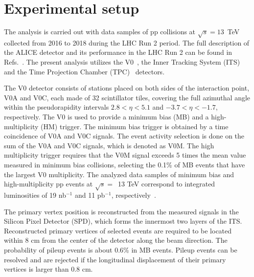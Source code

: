 

\section{Experimental setup}
\label{sec:experiment}

The analysis is carried out with data samples of pp collisions at $\sqrt{s} = 13$~TeV collected from 2016 to 2018 during the LHC Run 2 period. The full description of the ALICE detector and its performance in the LHC Run 2 can be found in Refs.~\cite{Aamodt:2008zz,Abelev:2014ffa}. The present analysis utilizes the V0~\cite{Abbas:2013taa}, the Inner Tracking System (ITS)~\cite{aliceITS} and the Time Projection Chamber (TPC)~\cite{aliceTPC} detectors.

The V0 detector consists of stations placed on both sides of the interaction point, V0A and V0C, each made of 32 scintillator tiles, covering the full azimuthal angle within the pseudorapidity intervals $2.8 < \eta < 5.1$ and $-3.7 < \eta < -1.7$, respectively. The V0 is used to provide a minimum bias (MB) and a high-multiplicity (HM) trigger. The minimum bias trigger is obtained by a time coincidence of V0A and V0C signals. The event activity selection is done on the sum of the V0A and V0C signals, which is denoted as V0M. The high multiplicity trigger requires that the V0M signal exceeds 5 times the mean value measured in minimum bias collisions, selecting the 0.1\% of MB events that have the largest V0 multiplicity. The analyzed data samples of minimum bias and high-multiplicity pp events at $\sqrt{s}=$~13 TeV correspond to integrated luminosities of 19 nb$^{-1}$ and 11 pb$^{-1}$, respectively~\cite{ALICE-PUBLIC-2016-002}.

The primary vertex position is reconstructed from the measured signals in the Silicon Pixel Detector (SPD), which forms the innermost two layers of the ITS. Reconstructed primary vertices of selected events are required to be located within 8 cm from the center of the detector along the beam direction. The probability of pileup events is about 0.6\% in MB events. Pileup events can be resolved and are rejected if the longitudinal displacement of their primary vertices is larger than 0.8 cm.

